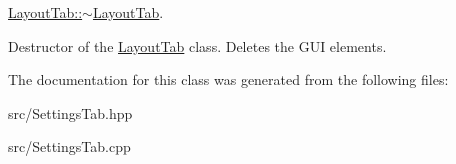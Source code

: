 \hyperlink{classLayoutTab_a9801cd1febbd7ce47aa9f0a5863596e9}{Layout\+Tab\+::$\sim$\+Layout\+Tab}. 

Destructor of the \hyperlink{classLayoutTab}{Layout\+Tab} class. Deletes the G\+U\+I elements. 

The documentation for this class was generated from the following files\+:\begin{DoxyCompactItemize}
\item 
src/Settings\+Tab.\+hpp\item 
src/Settings\+Tab.\+cpp\end{DoxyCompactItemize}
